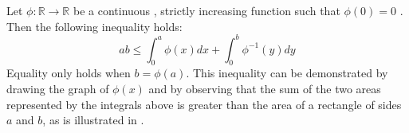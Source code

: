 \documentclass[12pt]{article}
\begin{document}
Let $\phi : \mathbb{R} \rightarrow \mathbb{R}$ be a continuous , strictly
increasing function such that $\phi(0)=0$ . Then the following inequality holds:
$$ ab \leq \int_{0}^a \phi(x) dx + \int_{0}^b \phi^{-1}(y) dy $$
Equality only holds when $b = \phi(a)$.
This inequality can be demonstrated by drawing the graph of $\phi(x)$
and by observing that the sum of the two areas represented by the integrals
above is greater than the area of a rectangle of sides $a$ and $b$, as
is illustrated in .
\end{document}
